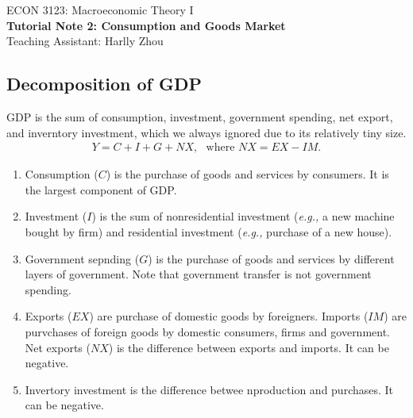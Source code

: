 \documentclass[12pt]{article}
\begin{document}
\begin{center}
    ECON 3123: Macroeconomic Theory I\\
    {\large \textbf{Tutorial Note 2: Consumption and Goods Market}}\\
    Teaching Assistant: Harlly Zhou
\end{center}

\subsection*{Decomposition of GDP}
GDP is the sum of consumption, investment, government spending, net export, and inverntory investment, which we always ignored due to its relatively tiny size.
\begin{align*}
    Y = C + I + G + NX,\,\,\,\, \text{where } NX = EX - IM.
\end{align*}
\begin{enumerate}[label=(\arabic*)]
    \item Consumption ($C$) is the purchase of goods and services by consumers. It is the largest component of GDP.
    \item Investment ($I$) is the sum of nonresidential investment (\textit{e.g.,} a new machine bought by firm) and residential investment (\textit{e.g., }purchase of a new house). 
    \item Government sepnding ($G$) is the purchase of goods and services by different layers of government. Note that government transfer is not government spending.
    \item Exports ($EX$) are purchase of domestic goods by foreigners. Imports ($IM$) are purvchases of foreign goods by domestic consumers, firms and government. Net exports ($NX$) is the difference between exports and imports. It can be negative. 
    \item Invertory investment is the difference betwee nproduction and purchases. It can be negative.
\end{enumerate}
\end{document}
